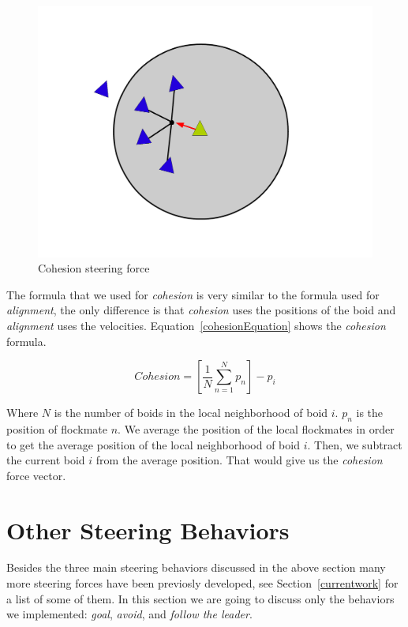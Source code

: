 \begin{figure}[htbp]
\begin{center}
\includegraphics[scale=0.3]{figures/cohesion.pdf}
\caption{Cohesion steering force}
\label{cohesionPDF}
\end{center}
\end{figure}

The formula that we used for \textit{cohesion} is very similar to the formula used for \textit{alignment}, the only difference is that \textit{cohesion} uses the positions of the boid and \textit{alignment} uses the velocities. Equation~\ref{cohesionEquation} shows the \textit{cohesion} formula.

\begin{equation}
\label{cohesionEquation}
Cohesion = \left[  \frac{1}{N} \sum_{n=1}^{N} p_n \right ] - p_i
\end{equation}

Where $N$ is the number of boids in the local neighborhood of boid $i$. $p_n$ is the position of flockmate $n$. We average the position of the local flockmates in order to get the average position of the local neighborhood of boid $i$. Then, we subtract the current boid $i$ from the average position. That would give us the \textit{cohesion} force vector.

\section{Other Steering Behaviors}
Besides the three main steering behaviors discussed in the above section many more steering forces have been previosly developed, see Section~\ref{currentwork} for a list of some of them. In this section we are going to discuss only the behaviors we implemented: \textit{goal}, \textit{avoid}, and \textit{follow the leader}.

